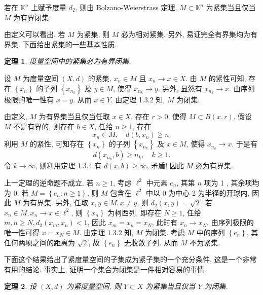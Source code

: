 \documentclass[openany]{ctexbook}
\makeatletter
\theoremstyle{kaiti}
\newtheorem{theorem}{定理}[section]
\theoremstyle{normal}
\renewenvironment{proof}[1][\proofname]{\par
    \pushQED{\qed}%
    \normalfont \topsep6\p@\@plus6\p@\relax
    \trivlist
    \item\relax
    {\heiti #1}\hspace{2\labelsep}\ignorespaces
  }{%
    \popQED\endtrivlist\@endpefalse
  }
\makeatother
\begin{document}
若在 $\mathbb{K}^n$ 上赋予度量 $d_2$, 则由 Bolzano-Weierstrass 定理, $M \subset \mathbb{K}^n$ 为紧集当且仅当 $M$ 为有界闭集.

由定义可以看出, 若 $M$ 为紧集, 则 $M$ 必为相对紧集. 另外, 易证完全有界集均为有界集. 下面给出紧集的一些基本性质.

\begin{theorem}
  度量空间中的紧集必为有界闭集.
\end{theorem}

\begin{proof}
设 $M$ 为度量空间 $(X, d)$ 的紧集, $x_n \in M$ 且 $x_n \rightarrow x \in X$. 由 $M$ 的紧性可知, 存在 $\left\{x_n\right\}$ 的子列 $\left\{x_{n_{k}}\right\}$ 及 $y \in M$, 使得 $x_{n_{k}} \rightarrow y$. 另外, 显然有 $x_{n_{k}} \rightarrow x$. 由序列极限的唯一性有 $x=y$. 从而 $x \in Y$. 由定理 1.3.2 知, $M$ 为闭集.

由定义, $M$ 为有界集当且仅当任取 $x \in X$, 存在 $r>0$, 使得 $M \subset B(x, r)$. 假设 $M$ 不是有界的, 则存在 $b \in X$, 任给 $n \geqslant 1$, 存在
$$
x_n \in M, \quad d\left(b, x_n\right) \geqslant n.
$$
利用 $M$ 的紧性, 可知存在 $\left\{x_n\right\}$ 的子列 $\left\{x_{n_{k}}\right\}$ 及 $x \in M$, 使得 $x_{n_{k}} \rightarrow x$. 于是有
$$
d\left(x_{n_{k}}, b\right) \geqslant n_{k}, \quad k \geqslant 1.
$$
令 $k \rightarrow \infty$, 则利用定理 1.3.4 有 $d(x, b) \geqslant \infty$, 矛盾! 因此 $M$ 必为有界集.
\end{proof}

上一定理的逆命题不成立. 若 $n \geqslant 1$, 考虑 $\ell^2$ 中元素 $e_n$, 其第 $n$ 项为 1 , 其余项均为 0. 若 $M=\left\{e_n: n \geqslant 1\right\}$, 则 $M$ 包含在 $\ell^2$ 中以 0 为中心 2 为半径的开球内, 因此 $M$ 为有界集. 另外, 任取 $x, y \in M, x \neq y$, 则 $d_2(x, y)=\sqrt{2}$. 若 $x_n \in M, x_n \rightarrow x \in \ell^2$, 则 $\left\{x_n\right\}$ 为柯西列, 即存在 $N \geqslant 1$, 任给 $m, n \geqslant N, d_2\left(x_m, x_n\right)<1$, 因此 $x_m=x_n=x_{N}$, 此时有 $x_n \rightarrow x_{N}$. 由序列极限的唯一性可得 $x=x_{N} \in M$. 由定理 1.3.2 知, $M$ 为闭集. 考虑 $M$ 中的序列 $\left\{e_n\right\}$, 其任何两项之间的距离为 $\sqrt{2}$, 故 $\left\{e_n\right\}$ 无收敛子列. 从而 $M$ 不为紧集.

下面这个结果给出了紧度量空间的子集成为紧子集的一个充分条件, 这是一个非常有用的结论. 事实上, 证明一个集合为闭集是一件相对容易的事情.

\begin{theorem}
  设 $(X, d)$ 为紧度量空间, 则 $Y \subset X$ 为紧集当且仅当 $Y$ 为闭集.
\end{theorem}
\end{document}
